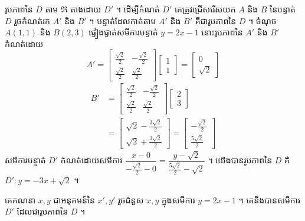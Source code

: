 រូបភាពនៃ $D$ តាម $\mathfrak{R}$ តាងដោយ $D'$ ។ ដើម្បីកំណត់ $D'$ គេត្រូវជ្រើសរើសយក $A$ និង $B$ នៃបន្ទាត់ $D$ រួចកំណត់រក $A'$ និង $B'$ ។ បន្ទាត់ដែលកាត់តាម $A'$ និង $B'$ គឺជារូបភាពនៃ $D$ ។ ចំណុច $A(1, 1)$ និង $B(2, 3)$ ផ្ទៀងផ្ទាត់សមីការបន្ទាត់ $y = 2x - 1$ នោះរូបភាពនៃ $A'$ និង $B'$ កំណត់ដោយ
\[ A' = \begin{bmatrix} \frac{\sqrt{2}}{2} & -\frac{\sqrt{2}}{2}\\[3pt] \frac{\sqrt{2}}{2} & \frac{\sqrt{2}}{2} \end{bmatrix}\begin{bmatrix} 1\\ 1 \end{bmatrix} = \begin{bmatrix} 0\\ \sqrt{2} \end{bmatrix} \]
\[
\begin{aligned}
B' &= \begin{bmatrix} \frac{\sqrt{2}}{2} & -\frac{\sqrt{2}}{2}\\[3pt] \frac{\sqrt{2}}{2} & \frac{\sqrt{2}}{2} \end{bmatrix}\begin{bmatrix} 2\\ 3 \end{bmatrix}\\
&= \begin{bmatrix} \sqrt{2} - \frac{3\sqrt{2}}{2}\\[3pt] \sqrt{2} + \frac{3\sqrt{2}}{2} \end{bmatrix} = \begin{bmatrix} -\frac{\sqrt{2}}{2}\\[3pt] \frac{5\sqrt{2}}{2} \end{bmatrix}
\end{aligned}
\]
សមីការបន្ទាត់ $D'$ កំណត់ដោយសមីការ $\dfrac{x - 0}{-\frac{\sqrt{2}}{2} - 0} = \dfrac{y - \sqrt{2}}{\frac{5\sqrt{2}}{2} - \sqrt{2}}$ ។ យើងបានរូបភាពនៃ $D$ គឺ $D' : y = -3x + \sqrt{2}$ ។

\begin{formulaBox}[ជាទូទៅ]
គេគណនា $x, y$ ជាអនុគមន៍នៃ $x', y'$ រួចជំនួស $x, y$ ក្នុងសមីការ $y = 2x - 1$ ។ គេនឹងបានសមីការ $D'$ ដែលជារូបភាពនៃ $D$ ។
\end{formulaBox}

